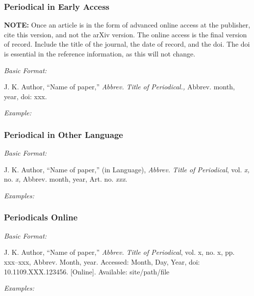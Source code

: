 \documentclass[10pt]{article}
\newcommand*{\guidelabel}[1]{\par\vspace{-4pt}\hspace*{22pt}\textit{#1}\par\vspace{-\parskip}}
\begin{document}
\subsubsection{Periodical in Early Access}

\textbf{NOTE:} Once an article is in the form of advanced online access at the publisher, cite this version, and not the arXiv version. The online access is the final version of record. Include the title of the journal, the date of record, and the doi. The doi is essential in the reference information, as this will not change.

\guidelabel{Basic Format:}
\begin{guideitems}
  \item J. K. Author, “Name of paper,” \textit{Abbrev. Title of Periodical.,} Abbrev. month, year, doi: xxx.
\end{guideitems}
\guidelabel{Example:}
\begin{guideitems}
  \item {}
\end{guideitems}

\subsubsection{Periodical in Other Language}
\guidelabel{Basic Format:}
\begin{guideitems}
  \item J. K. Author, “Name of paper,” (in Language), \textit{Abbrev. Title of Periodical}, vol. \textit{x,} no. \textit{x,} Abbrev. month, year, Art. no. \textit{xxx}.
\end{guideitems}
\guidelabel{Examples:}
\begin{guideitems}
  \item {}
  \item {}
\end{guideitems}

\subsubsection{Periodicals Online}
\guidelabel{Basic Format:}
\begin{guideitems}
  \item J. K. Author, “Name of paper,” \textit{Abbrev. Title of Periodical}, vol. x, no. x, pp. xxx–xxx, Abbrev. Month, year. Accessed: Month, Day, Year, doi: 10.1109.XXX.123456. [Online]. Available: site/path/file
\end{guideitems}
\guidelabel{Examples:}
\begin{guideitems}
  \item {}
  \item {}
\end{guideitems}
\end{document}
